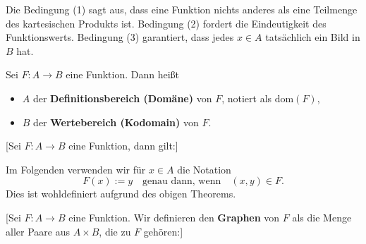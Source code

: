 \documentclass[main.tex]{subfiles}
\begin{document}



\begin{remark}
Die Bedingung (1) sagt aus, dass eine Funktion nichts anderes als eine Teilmenge des kartesischen Produkts ist.  
Bedingung (2) fordert die Eindeutigkeit des Funktionswerts.  
Bedingung (3) garantiert, dass jedes \(x\in A\) tatsächlich ein Bild in \(B\) hat.  
\end{remark}

\begin{definition}
Sei \(F\colon A\to B\) eine Funktion. Dann heißt
\begin{itemize}
  \item \(A\) der \textbf{Definitionsbereich (Domäne)} von \(F\), notiert als \(\mathrm{dom}(F)\),
  \item \(B\) der \textbf{Wertebereich (Kodomain)} von \(F\).
\end{itemize}
\end{definition}


[Sei \(F\colon A\to B\) eine Funktion, dann gilt:]
\begin{tabproof}
\end{tabproof}

\begin{remark}
Im Folgenden verwenden wir für \(x \in A\) die Notation
\[
F(x) := y \quad\text{genau dann, wenn}\quad (x,y)\in F.
\]
Dies ist wohldefiniert aufgrund des obigen Theorems.
\end{remark}

%
[Sei \(F\colon A\to B\) eine Funktion. Wir definieren den \textbf{Graphen} von \(F\) als die Menge aller Paare aus \(A\times B\), die zu \(F\) gehören:]
\end{document}
